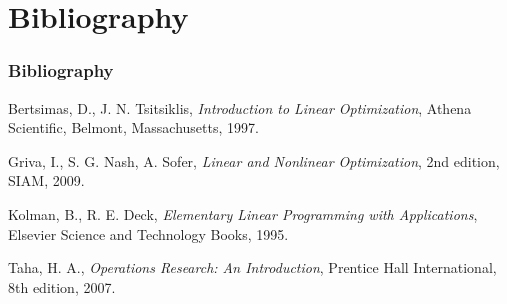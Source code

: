 \documentclass{beamer}
\theoremstyle{plain}
\begin{document}
\section{Bibliography}
\begin{frame}\frametitle{Bibliography}
\begin{thebibliography}{9}
\justifying

 Bertsimas, D., J. N. Tsitsiklis, \emph{Introduction to Linear Optimization}, Athena Scientific, Belmont, Massachusetts, 1997.

 Griva, I., S. G. Nash, A. Sofer, \emph{Linear and Nonlinear Optimization}, 2nd edition, SIAM, 2009.


 Kolman, B., R. E. Deck, \emph{Elementary Linear Programming with Applications}, Elsevier Science and Technology Books, 1995.


 Taha, H. A., \emph{Operations Research: An Introduction}, Prentice Hall International, 8th edition, 2007.



\end{thebibliography}
\end{frame}
\end{document}
